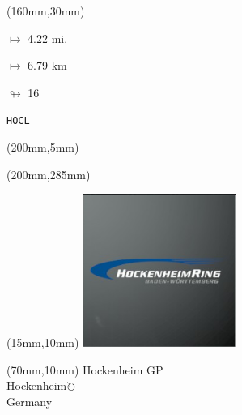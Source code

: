 \begin{textblock*}{40mm}(160mm,30mm)%
\Large
\par$\mapsto$ 4.22 mi.
\par$\mapsto$ 6.79 km
\par$\looparrowright$ 16
\par\hfill\tiny\tt HOCL\\
\end{textblock*}
\begin{textblock*}{20mm}(200mm,5mm)%
\fbox{\thepage}
\label{HOCL}
\end{textblock*}
\begin{textblock*}{20mm}(200mm,285mm)%
\fbox{\thepage}
\end{textblock*}

\null\newpage
\begin{textblock*}{50mm}(15mm,10mm)%
\includegraphics[width=50mm]{LG/2015-05-20_00082.png}
\end{textblock*}
\begin{textblock*}{130mm}(70mm,10mm)%
{\fontsize{20}{20}\selectfont Hockenheim GP\\}
{\fontsize{16}{16}\selectfont Hockenheim\hfill \Large$\circlearrowright$\\}
{\fontsize{12}{12}\selectfont Germany\\}
\end{textblock*}
